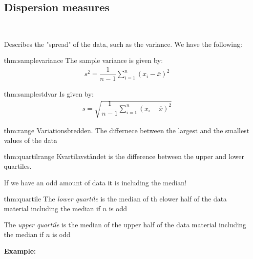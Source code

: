 \subsection{Dispersion measures}\hfill\\\par
\noindent Describes the "spread" of the data, such as the variance. We have the following:
\par\bigskip
\begin{theo}{thm:samplevariance}
  The sample variance is given by:
  \begin{equation*}
    \begin{gathered}
      s^2 = \dfrac{1}{n-1}\sum_{i=1}^{n}(x_i-\overline{x})^2
    \end{gathered}
  \end{equation*}
\end{theo}
\newpage
\begin{theo}{thm:samplestdvar}
  Is given by:
  \begin{equation*}
    \begin{gathered}
      s = \sqrt{\dfrac{1}{n-1}\sum_{i=1}^{n}(x_i-\overline{x})^2}
    \end{gathered}
  \end{equation*}
\end{theo}
\par\bigskip
\begin{theo}[Range]{thm:range}
  Variationsbredden. The differnece between the largest and the smallest values of the data 
\end{theo}
\par\bigskip
\begin{theo}{thm:quartilrange}
  Kvartilavståndet is the difference between the upper and lower quartiles.\par
  \noindent If we have an odd amount of data it is including the median!
\end{theo}
\par\bigskip
\begin{theo}{thm:quartile}
  The \textit{lower quartile} is the median of th elower half of the data material including the median if $n$ is odd
  \par\bigskip
  \noindent The \textit{upper quartile} is the median of the upper half of the data material including the median if $n$ is odd
\end{theo}
\par\bigskip
\noindent\textbf{Example:}\par
